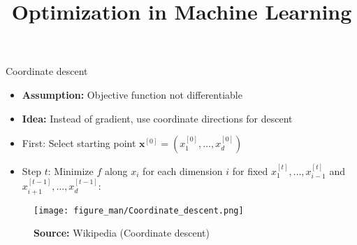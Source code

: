 \documentclass[11pt,compress,t,notes=noshow, xcolor=table]{beamer}
\title{Optimization in Machine Learning}
\begin{document}


\begin{vbframe}{Coordinate descent}

\begin{itemize}
    \item \textbf{Assumption:} Objective function not differentiable
    \item \textbf{Idea:} Instead of gradient, use coordinate directions for descent
\end{itemize}


\begin{itemize}
\item First: Select starting point $\bm{x}^{[0]} = (x^{[0]}_1, \ldots, x^{[0]}_d)$
\item Step $t$: Minimize $f$ along $x_i$ for each dimension $i$ for fixed $x^{[t]}_1, \ldots,x^{[t]}_{i-1}$ and $x^{[t-1]}_{i+1}, \ldots,x^{[t-1]}_d$:
\end{itemize}

\vspace{-0.5\baselineskip}

\begin{figure}
    \centering
    \texttt{[image: figure\_man/Coordinate\_descent.png]}
    \caption*{\small \textbf{Source:} Wikipedia (Coordinate descent)}
\end{figure}

\framebreak


\end{vbframe}
\end{document}
